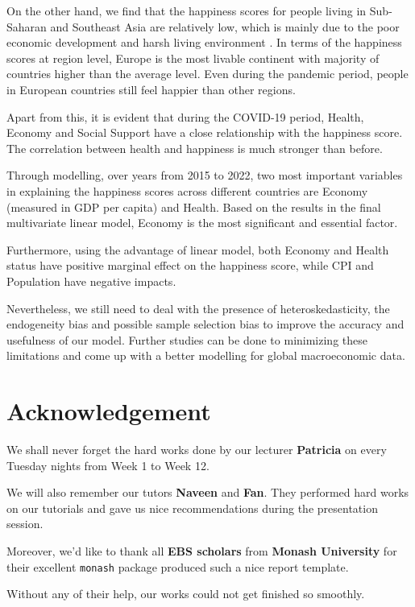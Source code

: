 \documentclass[11pt,a4paper,]{article}
\begin{document}
On the other hand, we find that the happiness scores for people living in Sub-Saharan and Southeast Asia are relatively low, which is mainly due to the poor economic development and harsh living environment \autocite{helliwell2021world}. In terms of the happiness scores at region level, Europe is the most livable continent with majority of countries higher than the average level. Even during the pandemic period, people in European countries still feel happier than other regions.

Apart from this, it is evident that during the COVID-19 period, Health, Economy and Social Support have a close relationship with the happiness score. The correlation between health and happiness is much stronger than before.

Through modelling, over years from 2015 to 2022, two most important variables in explaining the happiness scores across different countries are Economy (measured in GDP per capita) and Health. Based on the results in the final multivariate linear model, Economy is the most significant and essential factor.

Furthermore, using the advantage of linear model, both Economy and Health status have positive marginal effect on the happiness score, while CPI and Population have negative impacts.

Nevertheless, we still need to deal with the presence of heteroskedasticity, the endogeneity bias and possible sample selection bias to improve the accuracy and usefulness of our model. Further studies can be done to minimizing these limitations and come up with a better modelling for global macroeconomic data.

\hypertarget{acknowledgement}{%
\section{Acknowledgement}\label{acknowledgement}}

We shall never forget the hard works done by our lecturer \textbf{Patricia} on every Tuesday nights from Week 1 to Week 12.

We will also remember our tutors \textbf{Naveen} and \textbf{Fan}. They performed hard works on our tutorials and gave us nice recommendations during the presentation session.

Moreover, we'd like to thank all \textbf{EBS scholars} from \textbf{Monash University} for their excellent \texttt{monash} package produced such a nice report template.

Without any of their help, our works could not get finished so smoothly.
\end{document}
